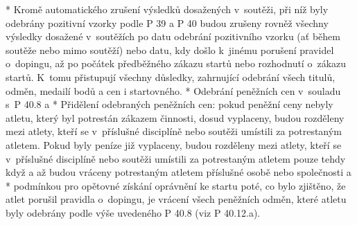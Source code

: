 * Kromě automatického zrušení výsledků dosažených v~soutěži, při níž byly odebrány pozitivní vzorky podle P 39 a P 40 budou zrušeny rovněž všechny výsledky dosažené v~soutěžích po datu odebrání pozitivního vzorku (ať během soutěže nebo mimo soutěží) nebo datu, kdy došlo k~jinému porušení pravidel o~dopingu, až po počátek předběžného zákazu startů nebo rozhodnutí o~zákazu startů. K~tomu přistupují všechny důsledky,  zahrnující odebrání všech titulů, odměn, medailí bodů a cen i startovného.
* Odebrání peněžních cen v~souladu s~P 40.8
  \begitems \style a
  * Přidělení odebraných peněžních cen: pokud peněžní ceny nebyly atletu, který byl potrestán zákazem činnosti, dosud vyplaceny, budou rozděleny mezi atlety, kteří se v~příslušné disciplíně nebo soutěži umístili za potrestaným atletem. Pokud byly peníze již vyplaceny, budou rozděleny mezi atlety, kteří se v~příslušné disciplíně nebo soutěži umístili za potrestaným atletem pouze tehdy když a až budou vráceny potrestaným atletem příslušné osobě nebo společnosti a
  * podmínkou pro opětovné získání oprávnění ke startu poté, co bylo zjištěno, že atlet porušil pravidla o~dopingu, je vrácení všech peněžních odměn, které atletu byly odebrány podle výše uvedeného P 40.8 (viz P 40.12.a).
  \enditems

